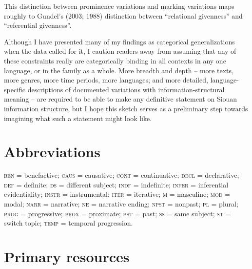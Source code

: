 \documentclass[output=paper]{LSP/langsci}
\begin{document}
This distinction between prominence variations and marking variations maps roughly to Gundel’s (2003; 1988) distinction between “relational givenness” and  “referential givenness”.

Although I have presented many of my findings as categorical generalizations when the data called for it, I caution readers away from assuming that any of these constraints really are categorically binding in all contexts in any one language, or in the family as a whole. More breadth and depth -- more texts, more genres, more time periods, more languages; and more detailed, language-specific descriptions of documented variations with information-structural meaning -- are required to be able to make any definitive statement on Siouan information structure, but I hope this sketch serves as a preliminary step towards imagining what such a statement might look like.

\section* {Abbreviations}

\textsc{ben} = benefactive; \textsc{caus} = causative; \textsc{cont} = continuative; \textsc{decl} = declarative; \textsc{def} = definite; \textsc{ds} =  different subject; \textsc{indf} = indefinite; \textsc{infer} = inferential evidentiality; \textsc{instr} = instrumental; \textsc{iter} = iterative; \textsc{m} =  masculine; \textsc{mod} = modal; \textsc{narr} = narrative; \textsc{ne} = narrative ending; \textsc{npst} = nonpast; \textsc{pl} = plural; \textsc{prog} =  progressive; \textsc{prox} = proximate; \textsc{pst} = past; \textsc{ss} = same subject; \textsc{st} = switch topic; \textsc{temp} = temporal progression.

\section*{Primary resources}
\end{document}

